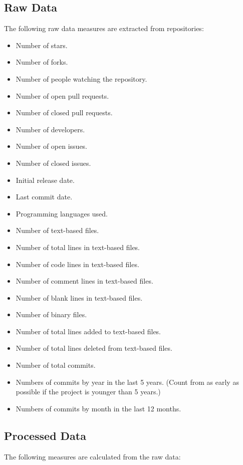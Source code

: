 \documentclass[letterpaper,cleveref]{lipics-v2019}
\begin{document}
\subsection{Raw Data}\label{rawdata}

The following raw data measures are extracted from repositories:

\begin{itemize}
\item Number of stars.
\item Number of forks.
\item Number of people watching the repository.
\item Number of open pull requests.
\item Number of closed pull requests.	
\item Number of developers.	
\item Number of open issues.
\item Number of closed issues.
\item Initial release date.
\item Last commit date.
\item Programming languages used.
\item Number of text-based files.
\item Number of total lines in text-based files.
\item Number of code lines in text-based files.
\item Number of comment lines in text-based files.
\item Number of blank lines in text-based files.
\item Number of binary files.  
\item Number of total lines added to text-based files.
\item Number of total lines deleted from text-based files.
\item Number of total commits.
\item Numbers of commits by year in the last 5 years. (Count from as early as
  possible if the project is younger than 5 years.)
\item Numbers of commits by month in the last 12 months.
\end{itemize}

\subsection{Processed Data}\label{processeddata}

The following measures are calculated from the raw data:
\end{document}

